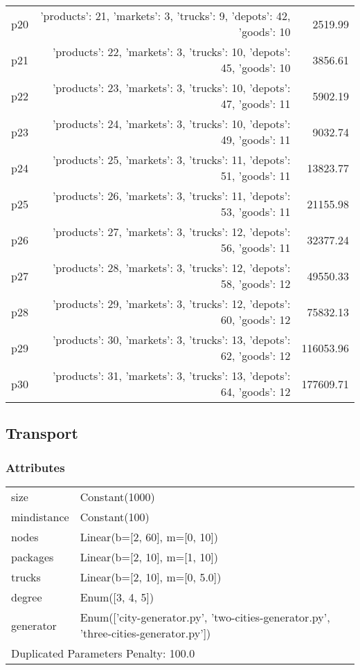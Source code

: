 \documentclass{article}
\begin{document}
\begin{center}
\begin{tabular}{@{}l|r|r@{}}
  p20&{'products': 21, 'markets': 3, 'trucks': 9, 'depots': 42, 'goods': 10}&2519.99\\
  p21&{'products': 22, 'markets': 3, 'trucks': 10, 'depots': 45, 'goods': 10}&3856.61\\
  p22&{'products': 23, 'markets': 3, 'trucks': 10, 'depots': 47, 'goods': 11}&5902.19\\
  p23&{'products': 24, 'markets': 3, 'trucks': 10, 'depots': 49, 'goods': 11}&9032.74\\
  p24&{'products': 25, 'markets': 3, 'trucks': 11, 'depots': 51, 'goods': 11}&13823.77\\
  p25&{'products': 26, 'markets': 3, 'trucks': 11, 'depots': 53, 'goods': 11}&21155.98\\
  p26&{'products': 27, 'markets': 3, 'trucks': 12, 'depots': 56, 'goods': 11}&32377.24\\
  p27&{'products': 28, 'markets': 3, 'trucks': 12, 'depots': 58, 'goods': 12}&49550.33\\
  p28&{'products': 29, 'markets': 3, 'trucks': 12, 'depots': 60, 'goods': 12}&75832.13\\
  p29&{'products': 30, 'markets': 3, 'trucks': 13, 'depots': 62, 'goods': 12}&116053.96\\
  p30&{'products': 31, 'markets': 3, 'trucks': 13, 'depots': 64, 'goods': 12}&177609.71
                            \end{tabular}
                            \end{center}
                    
                            \newpage \subsection{Transport}
                    \subsubsection*{Attributes}
                    \begin{tabular}{@{}p{}p{}@{}}
                    \toprule
                    size & Constant(1000)\\
mindistance & Constant(100)\\
nodes & Linear(b=[2, 60], m=[0, 10])\\
packages & Linear(b=[2, 10], m=[1, 10])\\
trucks & Linear(b=[2, 10], m=[0, 5.0])\\
degree & Enum([3, 4, 5])\\
generator & Enum(['city-generator.py', 'two-cities-generator.py', 'three-cities-generator.py']) \\
                    \bottomrule
                    \multicolumn{2}{l}{Duplicated Parameters Penalty: 100.0}
                    \end{tabular}
                
\end{document}
